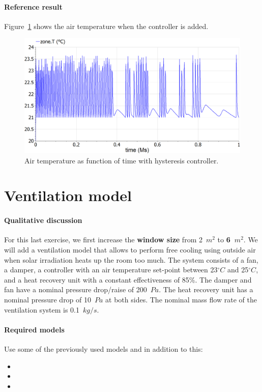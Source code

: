 \documentclass[10pt,a4paper]{article}
\begin{document}
\paragraph{Reference result}
Figure~\ref{fig:res5} shows the air temperature when the controller is added.
\begin{figure}[h]
\centering
\includegraphics[width=0.6\columnwidth]{img/result5.png}
\caption{Air temperature as function of time with hysteresis controller.}
\label{fig:res5}
\end{figure}


\section{Ventilation model} \label{sec:ventilation}
\paragraph{Qualitative discussion}
For this last exercise, we first increase the \textbf{window size} from 2~$m^2$ to \textbf{6~$m^2$}. We will add a ventilation model that allows to perform free cooling using outside air when solar irradiation heats up the room too much. The system consists of a fan, a damper, a controller with an air temperature set-point between 23$^{\circ}C$ and 25$^{\circ}C$, and a heat recovery unit with a constant effectiveness of 85\%. The damper and fan have a nominal pressure drop/raise of 200~$Pa$. The heat recovery unit has a nominal pressure drop of 10~$Pa$ at both sides. The nominal mass flow rate of the ventilation system is 0.1~$kg/s$.


\paragraph{Required models}
Use some of the previously used models and in addition to this:
\begin{itemize}
\item {}
\item {}
\item {}
\end{itemize}
\end{document}
